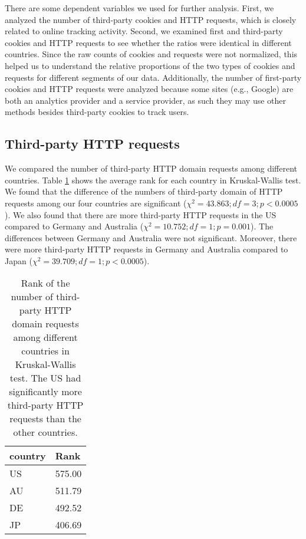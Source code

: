 \documentclass[conference]{IEEEtran}
\begin{document}
There are some dependent variables we used for further analysis. First, we analyzed the number of third-party cookies and HTTP requests, which is closely related to online tracking activity. Second, we examined first and third-party cookies and HTTP requests to see whether the ratios were identical in different countries. Since the raw counts of cookies and requests were not normalized, this helped us to understand the relative proportions of the two types of cookies and requests for different segments of our data. Additionally, the number of first-party cookies and HTTP requests were analyzed because some sites (e.g., Google) are both an analytics provider and a service provider, as such they may use other methods besides third-party cookies to track users. 

\subsection{Third-party HTTP requests}
We compared the number of third-party HTTP domain requests among different countries. 
Table \ref{thirdHTTP} shows the average rank for each country in Kruskal-Wallis test. We found that the difference of the numbers of third-party domain of HTTP requests among our four countries are significant ($\chi^{2} = 43.863; df = 3; p < 0.0005$). We also found that there are more third-party HTTP requests in the US compared to Germany and Australia ($\chi^{2} =10.752; df=1; p=0.001$). The differences between Germany and Australia were not significant. Moreover, there were more third-party HTTP requests in Germany and Australia compared to Japan ($\chi^{2} =39.709; df=1; p<0.0005$).

\begin{table}[t]
\centering
\caption{Rank of the number of third-party HTTP domain requests among different countries in Kruskal-Wallis test. The US had significantly more third-party HTTP requests than the other countries.}
\label{thirdHTTP}
\begin{tabular}{|l|l|}
\hline
\textbf{country} & \textbf{Rank} \\ \hline
US               & 575.00        \\ \hline
AU               & 511.79        \\ \hline
DE               & 492.52        \\ \hline
JP               & 406.69        \\ \hline
\end{tabular}
\end{table}
\end{document}

